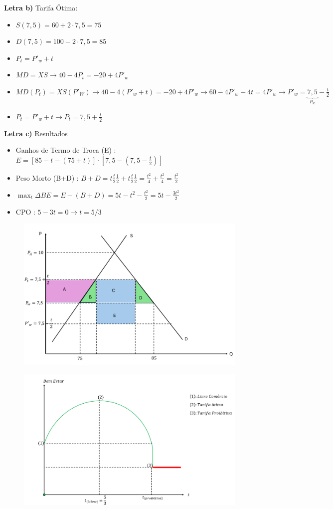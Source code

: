 \documentclass[a4paper,12pt]{article}[abntex2]
\begin{document}
\textbf{Letra b)} Tarifa Ótima: \begin{itemize}
    \item \(S(7,5)=60+2\cdot7,5=75\)
    \item \(D(7,5)=100-2\cdot7,5=85\)
    \item \(P_t=P'_w+t\)
    \item \(MD=XS\rightarrow40-4P_t=-20+4P'_w\)
    \item \(MD(P_t)=XS(P'_W)\rightarrow40-4(P'_w+t)=-20+4P'_w\rightarrow60-4P'_w-4t=4P'_w\rightarrow P'_w=\underbrace{7,5}_{P_w}-\frac{t}{2}\)
    \item \(P_t=P'_w+t\rightarrow P_t=7,5+\frac{t}{2}\)
\end{itemize}

\textbf{Letra c)} Resultados\begin{itemize}
    \item Ganhos de Termo de Troca (E) : \(E=[85-t-(75+t)]\cdot[7,5-(7,5-\frac{t}{2})]\)
    \item Peso Morto (B+D) : \(B+D = t\frac{t}{2}\frac{1}{2}+t\frac{t}{2}\frac{1}{2}=\frac{t^2}{4}+\frac{t^2}{4}=\frac{t^2}{2}\)
    \item \( \max_{t} \Delta BE = E -(B+D)=5t-t^2-\frac{t^2}{2}=5t-\frac{3t^2}{2}\)
    \item CPO : \(5-3t=0 \rightarrow t= 5/3\)
\end{itemize}

\begin{figure}[H]
    \centering
    \includegraphics[width=0.7\linewidth]{Imagens/a22i3.png}
\end{figure}

\begin{figure}[H]
    \centering
    \includegraphics[width=0.7\linewidth]{Imagens/a22i4.png}
\end{figure}
\end{document}
